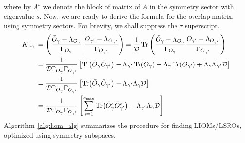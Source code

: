   where by \(A^s\) we denote the block of matrix of \(A\) in the symmetry sector with eigenvalue \(s\).
  Now, we are ready to derive the formula for the overlap matrix, using symmetry sectors. For brevity,
  we shall suppress the \(\tau\) superscript.
  \begin{align}
    K_{\gamma\gamma^{\prime}} &= \left(\frac{\bar{O}_{\gamma} - \Lambda_{O_{\gamma}}}{\Gamma_{O_{\gamma}}} \middle| \frac{\bar{O}_{\gamma^{\prime}} - \Lambda_{O_{\gamma^{\prime}}}}{\Gamma_{O_{\gamma^{\prime}}}}\right)
    = \frac{1}{\mathcal{D}} \Tr\left(\frac{\bar{O}_{\gamma} - \Lambda_{O_{\gamma}}}{\Gamma_{O_{\gamma}}}\frac{\bar{O}_{\gamma^{\prime}} - \Lambda_{O_{\gamma^{\prime}}}}{\Gamma_{O_{\gamma^{\prime}}}}\right) \nonumber \\
    &= \frac{1}{\mathcal{D} \Gamma_{O_{\gamma}}\Gamma_{O_{\gamma^{\prime}}}} \left[\Tr(\bar{O}_{\gamma} \bar{O}_{\gamma^{\prime}}) - \Lambda_{\gamma^{\prime}} \Tr(O_{\gamma}) - \Lambda_{\gamma} \Tr(O_{\gamma^{\prime}}) + \Lambda_{\gamma} \Lambda_{\gamma^{\prime}} \mathcal{D} \right]\nonumber\\
    &= \frac{1}{\mathcal{D} \Gamma_{O_{\gamma}}\Gamma_{O_{\gamma^{\prime}}}} \left[\Tr(\bar{O}_{\gamma} \bar{O}_{\gamma^{\prime}}) - \Lambda_{\gamma^{\prime}} \Lambda_{\gamma} \mathcal{D} \right] \nonumber\\
    &= \frac{1}{\mathcal{D} \Gamma_{O_{\gamma}}\Gamma_{O_{\gamma^{\prime}}}} \left[\sum_{s=1}^{s_{\text{max}}} \Tr(\bar{O}_{\gamma}^s \bar{O}_{\gamma^{\prime}}^s) - \Lambda_{\gamma^{\prime}} \Lambda_{\gamma} \mathcal{D} \right]
  \end{align}
  Algorithm~\ref{alg:liom_alg} summarizes the procedure for finding LIOMs/LSROs, optimized using symmetry subspaces.

